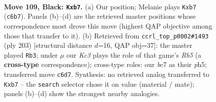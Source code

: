 \documentclass[11pt]{article}
\begin{document}
\clearpage

\begin{figure}[p]\centering
\begin{subfigure}{0.46\textwidth}\centering
\resizebox{\linewidth}{!}{%
\newchessgame
\chessboard[
  setfen={8/1PB5/2k5/3N2R1/1K6/7p/8/8 b - - 0 109},
  showmover=false,
  pgfstyle=straightmove, color=movearrow, markmove={c6-b7}
]}
\caption{}
\end{subfigure}\hfill
\begin{subfigure}{0.46\textwidth}\centering
\resizebox{\linewidth}{!}{%
\newchessgame
\chessboard[
  setfen={8/5R2/8/3K2kP/1r3N2/8/8/8 b - - 36 102},
  showmover=false,
  pgfstyle=straightmove, color=movearrow, markmove={b4-b3}
]}
\caption{}
\end{subfigure}
\\[4pt]

\caption{\textbf{Move 109, Black: \texttt{Kxb7}.} (a) Our position; Melanie plays \texttt{Kxb7} (\texttt{c6b7}). Panels (b)--(d) are the retrieved master positions whose correspondence most drove this move (highest QAP objective among those that transfer to it). (b) Retrieved from \texttt{ccrl\_top\_p0002\#1493} (ply 203) [structural distance $d$=16, QAP obj=37]: the master played \texttt{Rb3}; under $\mu$ our \emph{Kc3} plays the role of that game's \emph{Rb5} (a \textbf{cross-type} correspondence); cross-type roles: our \emph{b}c7 as their \emph{p}h5; transferred move \texttt{c6d7}. Synthesis: no retrieved analog transferred to \texttt{Kxb7} -- the \texttt{search} selector chose it on value (material / mate); panels (b)--(d) show the strongest nearby analogies.}
\label{fig:thought-m217}
\end{figure}

\clearpage
\end{document}
